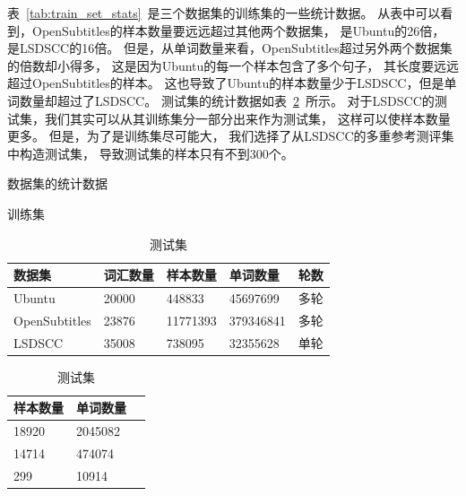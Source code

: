 表~\ref{tab:train_set_stats}~是三个数据集的训练集的一些统计数据。
从表中可以看到，OpenSubtitles的样本数量要远远超过其他两个数据集，
是Ubuntu的26倍， 是LSDSCC的16倍。
但是，从单词数量来看，OpenSubtitles超过另外两个数据集的倍数却小得多，
这是因为Ubuntu的每一个样本包含了多个句子，
其长度要远远超过OpenSubtitles的样本。
这也导致了Ubuntu的样本数量少于LSDSCC，但是单词数量却超过了LSDSCC。
测试集的统计数据如表~\ref{tab:test_set_stats}~所示。
对于LSDSCC的测试集，我们其实可以从其训练集分一部分出来作为测试集，
这样可以使样本数量更多。
但是，为了是训练集尽可能大，
我们选择了从LSDSCC的多重参考测评集中构造测试集，
导致测试集的样本只有不到300个。
\begin{table}[H]
    \centering
    \caption{数据集的统计数据}
    \begin{subtable}{0.6\linewidth}
        \centering
        \caption{训练集}
        \label{tab:train_set_stats}
        \begin{tabular}{lllll}
            \toprule
            \midrule
            数据集 & 词汇数量 & 样本数量 & 单词数量 & 轮数 \\
            \midrule
            Ubuntu & 20000 & 448833 & 45697699 & 多轮 \\
            OpenSubtitles & 23876 & 11771393 & 379346841 & 多轮 \\
            LSDSCC & 35008 & 738095 & 32355628 & 单轮 \\
            \bottomrule
        \end{tabular}
    \end{subtable}%
    \begin{subtable}{0.3\linewidth}
        \centering
        \caption{测试集}
        \label{tab:test_set_stats}
        \begin{tabular}{lll}
            \toprule
            \midrule
            样本数量 & 单词数量 \\
            \midrule
            18920 & 2045082   \\
            14714 & 474074 \\
            299 & 10914 \\
            \bottomrule
        \end{tabular}
    \end{subtable}
\end{table}

